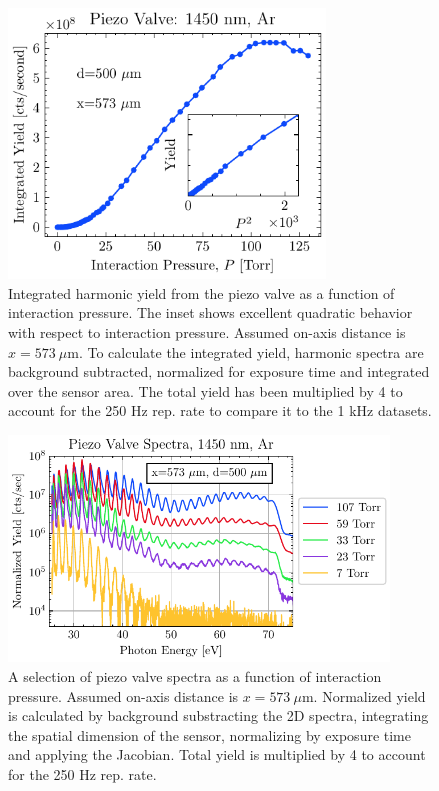 \begin{figure}
	\centering
	\includegraphics[width=0.75\textwidth]{figures/chap3/piezovalve_pscan.pdf}
	\caption{Integrated harmonic yield from the piezo valve as a function of interaction pressure. The inset shows excellent quadratic behavior with respect to interaction pressure. Assumed on-axis distance is $x = 573 \ \mu \textrm{m}$. To calculate the integrated yield, harmonic spectra are background subtracted, normalized for exposure time and integrated over the sensor area. The total yield has been multiplied by 4 to account for the 250 Hz rep. rate to compare it to the 1 kHz datasets.}
	\label{fig:piezovalve_pscan}
\end{figure}

\begin{figure}
	\centering
	\includegraphics[width=0.9\textwidth]{figures/chap3/piezovalve_spectra.pdf}
	\caption{A selection of piezo valve spectra as a function of interaction pressure. Assumed on-axis distance is $x = 573 \ \mu \textrm{m}$. Normalized yield is calculated by background substracting the 2D spectra, integrating the spatial dimension of the sensor, normalizing by exposure time and applying the Jacobian. Total yield is multiplied by 4 to account for the 250 Hz rep. rate.}
	\label{fig:piezovalve_spectra}
\end{figure}

